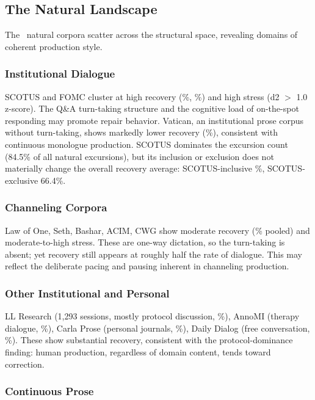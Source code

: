 \documentclass[final]{clv2025}
\begin{document}
\subsection{The Natural Landscape}

The \nNatural\ natural corpora scatter across the structural space, revealing domains of coherent production style.

\subsubsection{Institutional Dialogue}

SCOTUS and FOMC cluster at high recovery (\recSCOTUS\%, \recFOMC\%) and high stress (d2 $>$ 1.0 z-score). The Q\&A turn-taking structure and the cognitive load of on-the-spot responding may promote repair behavior. Vatican, an institutional prose corpus without turn-taking, shows markedly lower recovery (\recVatican\%), consistent with continuous monologue production. SCOTUS dominates the excursion count (84.5\% of all natural excursions), but its inclusion or exclusion does not materially change the overall recovery average: SCOTUS-inclusive \recNatCorpusAvg\%, SCOTUS-exclusive 66.4\%.

\subsubsection{Channeling Corpora}

Law of One, Seth, Bashar, ACIM, CWG show moderate recovery (\recChannelingMean\% pooled) and moderate-to-high stress. These are one-way dictation, so the turn-taking is absent; yet recovery still appears at roughly half the rate of dialogue. This may reflect the deliberate pacing and pausing inherent in channeling production.

\subsubsection{Other Institutional and Personal}

LL Research (1,293 sessions, mostly protocol discussion, \recLLResearch\%), AnnoMI (therapy dialogue, \recAnnoMI\%), Carla Prose (personal journals, \recCarlaProse\%), Daily Dialog (free conversation, \recDailyDialog\%). These show substantial recovery, consistent with the protocol-dominance finding: human production, regardless of domain content, tends toward correction.

\subsubsection{Continuous Prose}
\end{document}
